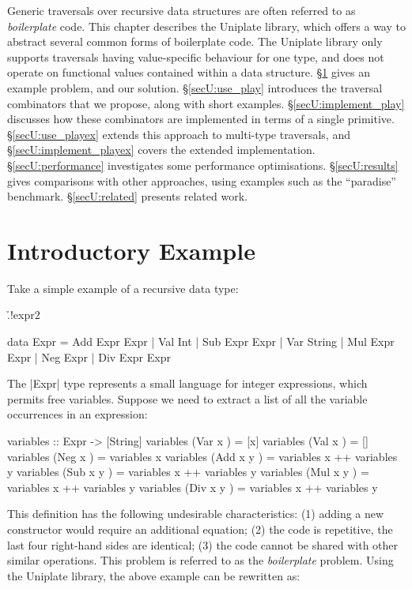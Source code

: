 Generic traversals over recursive data structures are often referred to as \textit{boilerplate} code. This chapter describes the Uniplate library, which offers a way to abstract several common forms of boilerplate code. The Uniplate library only supports traversals having value-specific behaviour for one type, and does not operate on functional values contained within a data structure. \S\ref{secU:intro} gives an example problem, and our solution. \S\ref{secU:use_play} introduces the traversal combinators that we propose, along with short examples. \S\ref{secU:implement_play} discusses how these combinators are implemented in terms of a single primitive. \S\ref{secU:use_playex} extends this approach to multi-type traversals, and \S\ref{secU:implement_playex} covers the extended implementation. \S\ref{secU:performance} investigates some performance optimisations. \S\ref{secU:results} gives comparisons with other approaches, using examples such as the ``paradise'' benchmark. \S\ref{secU:related} presents related work.

\section{Introductory Example}
\label{secU:intro}

Take a simple example of a recursive data type:

\h{.!expr2}\begin{code}
data Expr  =  Add  Expr  Expr  |  Val  Int
           |  Sub  Expr  Expr  |  Var  String
           |  Mul  Expr  Expr  |  Neg  Expr
           |  Div  Expr  Expr
\end{code}

The |Expr| type represents a small language for integer expressions, which permits free variables. Suppose we need to extract a list of all the variable occurrences in an expression:

\begin{onepage}
\begin{code}
variables :: Expr -> [String]
variables (Var  x    ) = [x]
variables (Val  x    ) = []
variables (Neg  x    ) = variables x
variables (Add  x y  ) = variables x ++ variables y
variables (Sub  x y  ) = variables x ++ variables y
variables (Mul  x y  ) = variables x ++ variables y
variables (Div  x y  ) = variables x ++ variables y
\end{code}
\end{onepage}

This definition has the following undesirable characteristics: (1) adding a new constructor would require an additional equation; (2) the code is repetitive, the last four right-hand sides are identical; (3) the code cannot be shared with other similar operations. This problem is referred to as the \textit{boilerplate} problem. Using the Uniplate library, the above example can be rewritten as:

